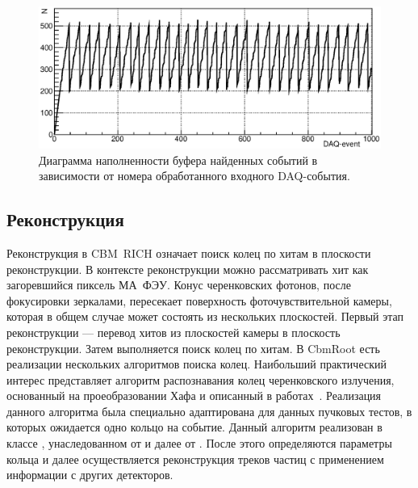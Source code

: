 \begin{figure}[H]
\centering
\includegraphics[width=1.0\textwidth]{pictures/16_Buff.eps}
\caption{Диаграмма наполненности буфера найденных событий в зависимости от номера обработанного входного DAQ-события.}
\label{fig:Buffer}
\end{figure}

\subsection{Реконструкция}

Реконструкция в CBM~RICH означает поиск колец по хитам в плоскости реконструкции. В контексте реконструкции можно рассматривать хит как загоревшийся пиксель МА~ФЭУ. Конус черенковских фотонов, после фокусировки зеркалами, пересекает поверхность фоточувствительной камеры, которая в общем случае может состоять из нескольких плоскостей. Первый этап реконструкции --- перевод хитов из плоскостей камеры в плоскость реконструкции. Затем выполняется поиск колец по хитам. В CbmRoot есть реализации нескольких алгоритмов поиска колец. Наибольший практический интерес представляет алгоритм распознавания колец черенковского излучения, основанный на проеобразовании Хафа и описанный в работах~\cite{RECOPEPAN, RECO2}. Реализация данного алгоритма была специально адаптирована для данных пучковых тестов, в которых ожидается одно кольцо на событие. Данный алгоритм реализован в классе , унаследованном от  и далее от . После этого определяются параметры кольца и далее осуществляется реконструкция треков частиц с применением информации с других детекторов.
